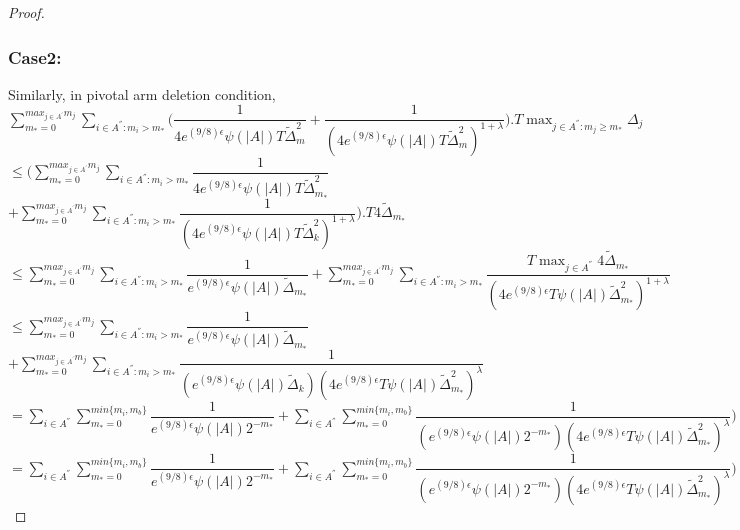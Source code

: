 \begin{proof}
\subsubsection{\textbf{Case2:}}
Similarly, in pivotal arm deletion condition,
\newline
$\sum_{m_{*}=0}^{max_{j\in A^{'}}m_{j}}\sum_{i\in A^{''}:m_{i}>m_{*}}\bigg(\dfrac{1}{4e^{(9/8)\epsilon}\psi(|A|)T\tilde{\Delta}_{m}^{2}} + \dfrac{1}{(4e^{(9/8)\epsilon}\psi(|A|)T\tilde{\Delta}_{m}^{2})^{1+\lambda}}\bigg).T\max_{j\in A^{''}:m_{j}\geq m_{*}}{\Delta}_{j}$
\newline
\hspace*{0em}$\leq\bigg(\sum_{m_{*}=0}^{max_{j\in A^{'}}m_{j}}\sum_{i\in A^{''}:m_{i}>m_{*}}\dfrac{1}{4e^{(9/8)\epsilon}\psi(|A|)T\tilde{\Delta}_{m_{*}}^{2}}$
\newline\hspace*{15em}$ + \sum_{m_{*}=0}^{max_{j\in A^{'}}m_{j}}\sum_{i\in A^{''}:m_{i}>m_{*}}\dfrac{1}{(4e^{(9/8)\epsilon}\psi(|A|)T\tilde{\Delta}_{k}^{2})^{1+\lambda}}\bigg).T4\tilde{\Delta}_{m_{*}}$
\newline
\hspace*{0em}$\leq\sum_{m_{*}=0}^{max_{j\in A^{'}}m_{j}}\sum_{i\in A^{''}:m_{i}>m_{*}}\dfrac{1}{e^{(9/8)\epsilon}\psi(|A|)\tilde{\Delta}_{m_{*}}} + \sum_{m_{*}=0}^{max_{j\in A^{'}}m_{j}}\sum_{i\in A^{''}:m_{i}>m_{*}}\dfrac{T\max_{j\in A^{''}}{4\tilde{\Delta}}_{m_{*}}}{(4e^{(9/8)\epsilon}T\psi(|A|)\tilde{\Delta}_{m_{*}}^{2})^{1+\lambda}}$
\newline
\hspace*{0em}$\leq\sum_{m_{*}=0}^{max_{j\in A^{'}}m_{j}}\sum_{i\in A^{''}:m_{i}>m_{*}}\dfrac{1}{e^{(9/8)\epsilon}\psi(|A|)\tilde{\Delta}_{m_{*}}} $
\newline\hspace*{15em} $+ \sum_{m_{*}=0}^{max_{j\in A^{'}}m_{j}}\sum_{i\in A^{''}:m_{i}>m_{*}}\dfrac{1}{(e^{(9/8)\epsilon}\psi(|A|)\tilde{\Delta}_{k})(4e^{(9/8)\epsilon}T\psi(|A|)\tilde{\Delta}_{m_{*}}^{2})^{\lambda}}$
\newline
\hspace*{0em}$=\sum_{i\in A^{''}}\sum_{m_{*}=0}^{min\lbrace m_{i},m_{b}\rbrace}\dfrac{1}{e^{(9/8)\epsilon}\psi(|A|)2^{-m_{*}}} + \sum_{i\in A^{''}}\sum_{m_{*}=0}^{min\lbrace m_{i},m_{b}\rbrace}\dfrac{1}{(e^{(9/8)\epsilon}\psi(|A|)2^{-m_{*}})(4e^{(9/8)\epsilon}T\psi(|A|)\tilde{\Delta}_{m_{*}}^{2})^{\lambda}})$
\newline
\hspace*{0em}$=\sum_{i\in A^{''}}\sum_{m_{*}=0}^{min\lbrace m_{i},m_{b}\rbrace}\dfrac{1}{e^{(9/8)\epsilon}\psi(|A|)2^{-m_{*}}} + \sum_{i\in A^{''}}\sum_{m_{*}=0}^{min\lbrace m_{i},m_{b}\rbrace}\dfrac{1}{(e^{(9/8)\epsilon}\psi(|A|)2^{-m_{*}})(4e^{(9/8)\epsilon}T\psi(|A|)\tilde{\Delta}_{m_{*}}^{2})^{\lambda}})$

\end{proof}
